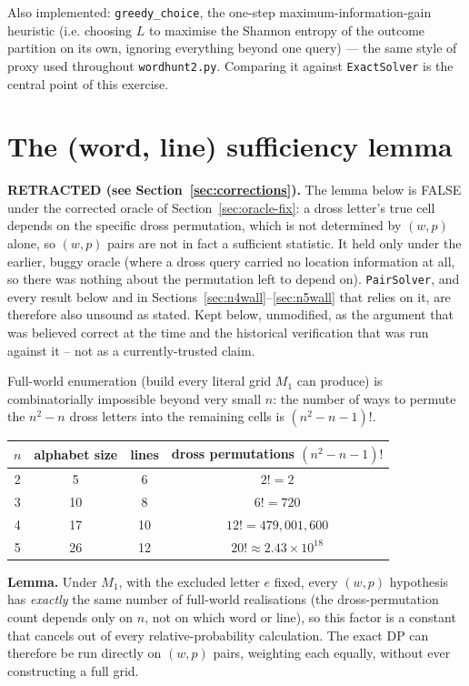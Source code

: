 \documentclass[11pt]{article}
\begin{document}
Also implemented: \texttt{greedy\_choice}, the one-step
maximum-information-gain heuristic (i.e. choosing $L$ to maximise the
Shannon entropy of the outcome partition on its own, ignoring everything
beyond one query) --- the same style of proxy used throughout
\texttt{wordhunt2.py}. Comparing it against \texttt{ExactSolver} is the
central point of this exercise.

\section{The (word, line) sufficiency lemma}
\label{sec:lemma}

\textbf{RETRACTED (see Section~\ref{sec:corrections}).} The lemma below is
FALSE under the corrected oracle of Section~\ref{sec:oracle-fix}: a dross
letter's true cell depends on the specific dross permutation, which is not
determined by $(w,p)$ alone, so $(w,p)$ pairs are not in fact a sufficient
statistic. It held only under the earlier, buggy oracle (where a dross
query carried no location information at all, so there was nothing about
the permutation left to depend on). \texttt{PairSolver}, and every result
below and in Sections~\ref{sec:n4wall}--\ref{sec:n5wall} that relies on it,
are therefore also unsound as stated. Kept below, unmodified, as the
argument that was believed correct at the time and the historical
verification that was run against it -- not as a currently-trusted claim.

Full-world enumeration (build every literal grid $M_1$ can produce) is
combinatorially impossible beyond very small $n$: the number of ways to
permute the $n^2-n$ dross letters into the remaining cells is
$(n^2-n-1)!$.

\begin{center}
\begin{tabular}{cccc}
\toprule
$n$ & alphabet size & lines & dross permutations $(n^2-n-1)!$ \\
\midrule
2 & 5  & 6  & $2! = 2$ \\
3 & 10 & 8  & $6! = 720$ \\
4 & 17 & 10 & $12! = 479{,}001{,}600$ \\
5 & 26 & 12 & $20! \approx 2.43\times10^{18}$ \\
\bottomrule
\end{tabular}
\end{center}

\textbf{Lemma.} Under $M_1$, with the excluded letter $e$ fixed, every
$(w,p)$ hypothesis has \emph{exactly} the same number of full-world
realisations (the dross-permutation count depends only on $n$, not on which
word or line), so this factor is a constant that cancels out of every
relative-probability calculation. The exact DP can therefore be run
directly on $(w,p)$ pairs, weighting each equally, without ever
constructing a full grid.
\end{document}
